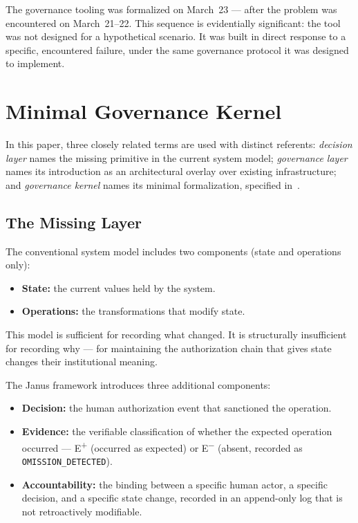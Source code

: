 \documentclass[conference]{IEEEtran}
\begin{document}
The governance tooling was formalized on March~23 --- after the problem was encountered on March~21--22. This sequence is evidentially significant: the tool was not designed for a hypothetical scenario. It was built in direct response to a specific, encountered failure, under the same governance protocol it was designed to implement.

\section{Minimal Governance Kernel}

In this paper, three closely related terms are used with distinct referents: \emph{decision layer} names the missing primitive in the current system model; \emph{governance layer} names its introduction as an architectural overlay over existing infrastructure; and \emph{governance kernel} names its minimal formalization, specified in~\cite{sanchez_core,sanchez_framework}.

\subsection{The Missing Layer}

The conventional system model includes two components (state and operations only):

\begin{itemize}
  \item \textbf{State:} the current values held by the system.
  \item \textbf{Operations:} the transformations that modify state.
\end{itemize}

This model is sufficient for recording what changed. It is structurally insufficient for recording why --- for maintaining the authorization chain that gives state changes their institutional meaning.

The Janus framework introduces three additional components:

\begin{itemize}
  \item \textbf{Decision:} the human authorization event that sanctioned the operation.
  \item \textbf{Evidence:} the verifiable classification of whether the expected operation occurred --- E\textsuperscript{+} (occurred as expected) or E\textsuperscript{$-$} (absent, recorded as \texttt{OMISSION\_DETECTED}).
  \item \textbf{Accountability:} the binding between a specific human actor, a specific decision, and a specific state change, recorded in an append-only log that is not retroactively modifiable.
\end{itemize}
\end{document}
